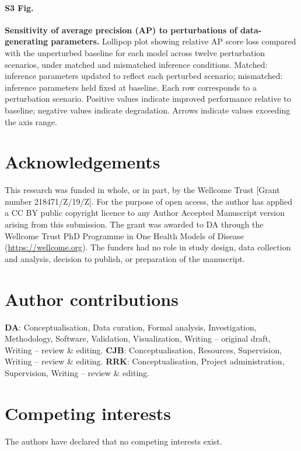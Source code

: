 \documentclass[10pt,letterpaper]{article}
\begin{document}
\paragraph*{S3 Fig.}\label{par:S3_Fig}
\textbf{Sensitivity of average precision (AP) to perturbations of data-generating parameters.}
Lollipop plot showing relative AP score loss compared with the unperturbed baseline for each model across twelve perturbation scenarios, under matched and mismatched inference conditions. Matched: inference parameters updated to reflect each perturbed scenario; mismatched: inference parameters held fixed at baseline. Each row corresponds to a perturbation scenario. Positive values indicate improved performance relative to baseline; negative values indicate degradation. Arrows indicate values exceeding the axis range.

\section*{Acknowledgements}
This research was funded in whole, or in part, by the Wellcome Trust [Grant number 218471/Z/19/Z]. For the purpose of open access, the author has applied a CC BY public copyright licence to any Author Accepted Manuscript version arising from this submission. The grant was awarded to DA through the Wellcome Trust PhD Programme in One Health Models of Disease (\url{https://wellcome.org}). The funders had no role in study design, data collection and analysis, decision to publish, or preparation of the manuscript.

\section*{Author contributions}
\textbf{DA}: Conceptualisation, Data curation, Formal analysis, Investigation, Methodology, Software, Validation, Visualization, Writing -- original draft, Writing -- review \& editing.%
\textbf{CJB}: Conceptualisation, Resources, Supervision, Writing -- review \& editing.%
\textbf{RRK}: Conceptualisation, Project administration, Supervision, Writing -- review \& editing.%

\section*{Competing interests}
The authors have declared that no competing interests exist.

\nolinenumbers%



\end{document}
